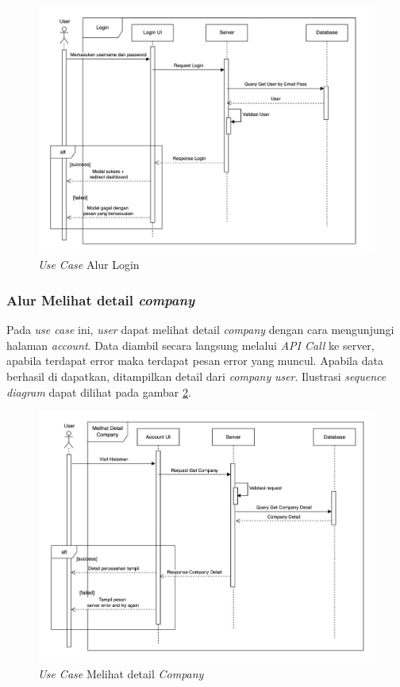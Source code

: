 \begin{figure}[ht]
  \centering
  \includegraphics[width=1\textwidth]{resources/chapter-3/usecase/uc-05.jpg}
  \caption{\textit{Use Case} Alur Login}
  \label{fig:usecase-05}
\end{figure}

\subsubsection{Alur Melihat detail \textit{company}}

Pada \textit{use case} ini, \textit{user} dapat melihat detail \textit{company} dengan cara mengunjungi halaman \textit{account}. Data diambil secara langsung melalui \textit{API Call} ke server, apabila terdapat error maka terdapat pesan error yang muncul. Apabila data berhasil di dapatkan, ditampilkan detail dari \textit{company} \textit{user}. Ilustrasi \textit{sequence diagram} dapat dilihat pada gambar \ref{fig:usecase-06}.

\begin{figure}[ht]
  \centering
  \includegraphics[width=1\textwidth]{resources/chapter-3/usecase/uc-06.jpg}
  \caption{\textit{Use Case} Melihat detail \textit{Company}}
  \label{fig:usecase-06}
\end{figure}


